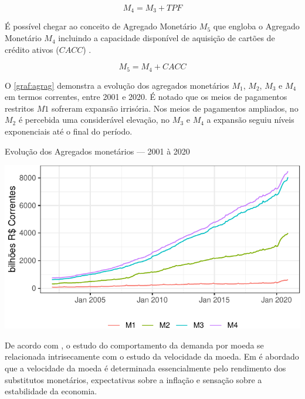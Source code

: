 \documentclass[
  12pt,
  12pt,
  openright,
  oneside,
  a4paper,
  chapter=TITLE,
  section=TITLE,
  subsection=TITLE,
  subsubsection=TITLE,
  english,
  portugues,
  sumario=tradicional]{abntex2}
\begin{document}
\begin{equation}
M_4 = M_3 + TPF
\end{equation}

É possível chegar ao conceito de Agregado Monetário \(M_5\) que engloba o Agregado Monetário \(M_4\) incluindo a capacidade disponível de aquisição de cartões de crédito ativos (\(CACC\)) \cite{cordoba:1996}.

\begin{equation}
M_5 = M_4 + CACC
\end{equation}

O \autoref{graf:agrag} demonstra a evolução dos agregados monetários \(M_1\), \(M_2\), \(M_3\) e \(M_4\) em termos correntes, entre 2001 e 2020. É notado que os meios de pagamentos restritos \(M1\) sofreram expansão irrisória. Nos meios de pagamentos ampliados, no \(M_2\) é percebida uma considerável elevação, no \(M_3\) e \(M_4\) a expansão seguiu níveis exponenciais até o final do período.

\begin{grafico}[!hbtp]
\vspace{20pt}
\caption{Evolução dos Agregados monetários — 2001 à 2020}
\vspace{-4mm}

\begin{center}\includegraphics{12-exportedfigures/m2m3m4-1} \end{center}
\vspace{-3mm}
\label{graf:agrag}
\vspace{-2mm}
\end{grafico}

De acordo com \textcite{friedman:1982}, o estudo do comportamento da demanda por moeda se relacionada intrisecamente com o estudo da velocidade da moeda. Em \textcite{friedman:1963} é abordado que a velocidade da moeda é determinada essencialmente pelo rendimento dos substitutos monetários, expectativas sobre a inflação e sensação sobre a estabilidade da economia.
\end{document}
